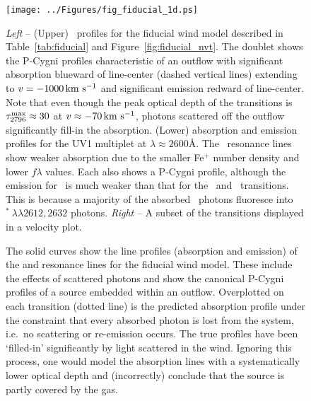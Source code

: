 \documentclass[12pt,preprint]{aastex}
\begin{document}
\begin{figure}
\texttt{[image: ../Figures/fig\_fiducial\_1d.ps]}
\caption{
{\it Left} -- (Upper) \mgiid\ profiles for the fiducial wind model
described in Table~\ref{tab:fiducial} and
Figure~\ref{fig:fiducial_nvt}.  The doublet shows the P-Cygni profiles
characteristic of an outflow with significant absorption blueward of
line-center (dashed vertical lines) extending to $v = -1000\, {\rm km~s^{-1}}$
and significant emission redward of line-center.  Note
that even though the peak optical depth of the  transitions
is $\tau_{2796}^{\rm max} \approx 30$ at $v \approx -70 \, {\rm km~s^{-1}}$,
photons scattered off the outflow significantly fill-in the absorption.
(Lower)  absorption and emission profiles for the UV1
multiplet at $\lambda \approx 2600$\AA.  The \feiid\ resonance lines 
show weaker absorption due to the smaller Fe$^+$ number density and
lower $f\lambda$ values.  Each also shows a P-Cygni profile, although
the emission for \feiia\ is much weaker than that for the
\feiib\ and \mgiid\ transitions.  This is because a majority of the
absorbed \feiia\ photons fluoresce into
$^*~\lambda\lambda 2612, 2632$ photons.
{\it Right} -- A subset of the transitions displayed in a velocity
plot.
}
\label{fig:fiducial_1d}
\end{figure}

\begin{figure}
\caption{
The solid curves show the line profiles (absorption and emission) of
the  and  resonance lines for the fiducial wind
model.  These include the effects of scattered photons and show the
canonical P-Cygni profiles of a source 
embedded within an outflow.  Overplotted on each transition (dotted line) is
the predicted absorption profile under the constraint that every
absorbed photon is lost from the system, i.e.\ no scattering or
re-emission occurs.   The true profiles have been `filled-in' 
significantly by light scattered in the wind.  Ignoring this
process, one would model the absorption lines with a systematically lower
optical depth and (incorrectly) conclude that the source is partly covered by the
gas.  
}
\label{fig:noemiss}
\end{figure}
\end{document}
